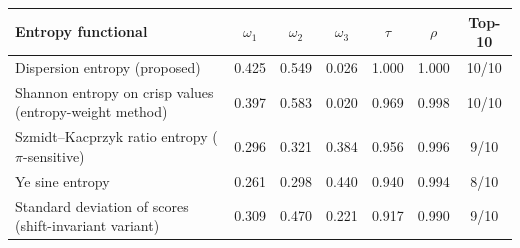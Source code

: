 \begin{tabular}{lcccccc}
\toprule
Entropy functional & $\omega_1$ & $\omega_2$ & $\omega_3$ & $\tau$ & $\rho$ & Top-10 \\
\midrule
Dispersion entropy (proposed) & 0.425 & 0.549 & 0.026 & 1.000 & 1.000 & 10/10 \\
Shannon entropy on crisp values (entropy-weight method) & 0.397 & 0.583 & 0.020 & 0.969 & 0.998 & 10/10 \\
Szmidt--Kacprzyk ratio entropy ($\pi$-sensitive) & 0.296 & 0.321 & 0.384 & 0.956 & 0.996 & 9/10 \\
Ye sine entropy & 0.261 & 0.298 & 0.440 & 0.940 & 0.994 & 8/10 \\
Standard deviation of scores (shift-invariant variant) & 0.309 & 0.470 & 0.221 & 0.917 & 0.990 & 9/10 \\
\bottomrule
\end{tabular}
